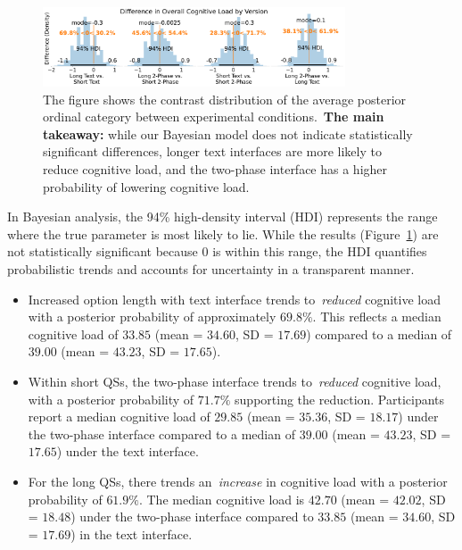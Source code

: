 \begin{figure}[h]
    \centering
    \includegraphics[width=0.8\textwidth]{content/image/cog/weighted_cog_version_single_row.pdf}
    \caption{The figure shows the contrast distribution of the average posterior ordinal category between experimental conditions.~\textbf{The main takeaway:} while our Bayesian model does not indicate statistically significant differences, longer text interfaces are more likely to reduce cognitive load, and the two-phase interface has a higher probability of lowering cognitive load.}
    \label{fig:weighted_cog_version}
\end{figure}

In Bayesian analysis, the 94\% high-density interval (HDI) represents the range where the true parameter is most likely to lie. While the results (Figure~\ref{fig:weighted_cog_version}) are not statistically significant because 0 is within this range, the HDI quantifies probabilistic trends and accounts for uncertainty in a transparent manner.
\begin{itemize}[leftmargin=*]
    \item Increased option length with text interface trends to~\textit{reduced} cognitive load with a posterior probability of approximately $69.8\%$. This reflects a median cognitive load of $33.85$ (mean = $34.60$, SD = $17.69$) compared to a median of $39.00$ (mean = $43.23$, SD = $17.65$).
    \item Within short QSs, the two-phase interface trends to~\textit{reduced} cognitive load, with a posterior probability of $71.7\%$ supporting the reduction. Participants report a median cognitive load of $29.85$ (mean = $35.36$, SD = $18.17$) under the two-phase interface compared to a median of $39.00$ (mean = $43.23$, SD = $17.65$) under the text interface.
    \item For the long QSs, there trends an~\textit{increase} in cognitive load with a posterior probability of $61.9\%$. The median cognitive load is $42.70$ (mean = $42.02$, SD = $18.48$) under the two-phase interface compared to $33.85$ (mean = $34.60$, SD = $17.69$) in the text interface.
\end{itemize}

